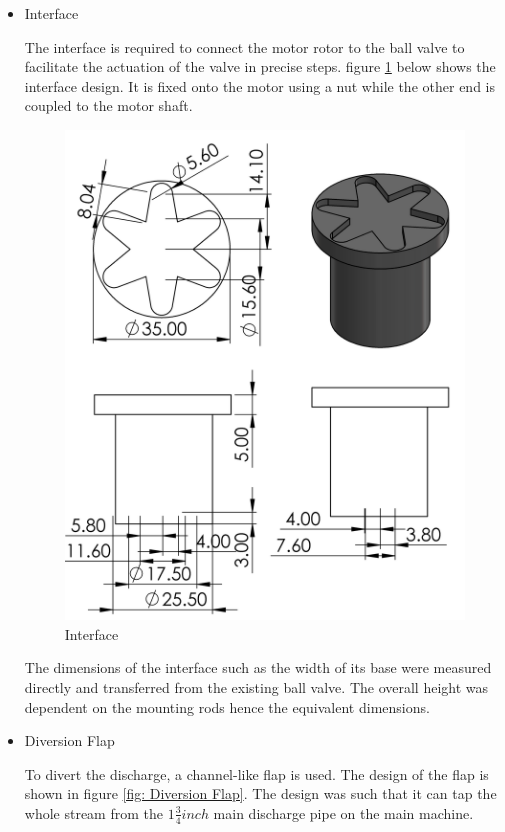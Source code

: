 \begin{itemize}
        \item Interface
\par
The interface is required to connect the motor rotor to the ball valve to facilitate the actuation of the valve in precise steps. figure \ref{fig: Interface} below shows the interface design. It is fixed onto the motor using a nut while the other end is coupled to the motor shaft.
\begin{figure}[H]
        \centering
        \includegraphics [width=.8\textwidth] {Figures/interface.PNG}
        \caption{Interface}
        \label{fig: Interface}
        \end{figure}
The dimensions of the interface such as the width of its base were measured directly and transferred from the existing ball valve. The overall height was dependent on the mounting rods hence the equivalent dimensions. 
        \item Diversion Flap
\par
To divert the discharge, a channel-like flap is used. The design of the flap is shown in figure \ref{fig: Diversion Flap}. The design was such that it can tap the whole stream from the $1\frac{3}{4} inch$ main discharge pipe on the main machine. 
\begin{figure}[H]
        \centering

\end{figure}
\end{itemize}
